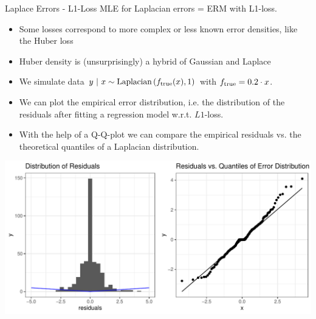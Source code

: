 \documentclass[11pt,compress,t,notes=noshow, xcolor=table]{beamer}
\begin{document}
\begin{vbframe}{Laplace Errors - L1-Loss}
MLE for Laplacian errors = ERM with L1-loss. 

\begin{itemize}
\item Some losses correspond to more complex or less known error densities, like the Huber loss 

\item Huber density is (unsurprisingly) a hybrid of Gaussian and Laplace

\end{itemize}

\framebreak 

\begin{footnotesize}
\begin{itemize}
	\item We simulate data $y ~|~x \sim \text{Laplacian}\left(f_{\text{true}}(x), 1\right)$ with $f_{\text{true}} = 0.2 \cdot x$. 
\item We can plot the empirical error distribution, i.e. the distribution of the residuals after fitting a regression model w.r.t. $L1$-loss.
\item With the help of a Q-Q-plot we can compare the empirical residuals vs. the theoretical quantiles of a Laplacian distribution.  
\end{itemize}
\end{footnotesize}
\includegraphics{figure/residuals_plot_L1.pdf}



\end{vbframe}
\end{document}
